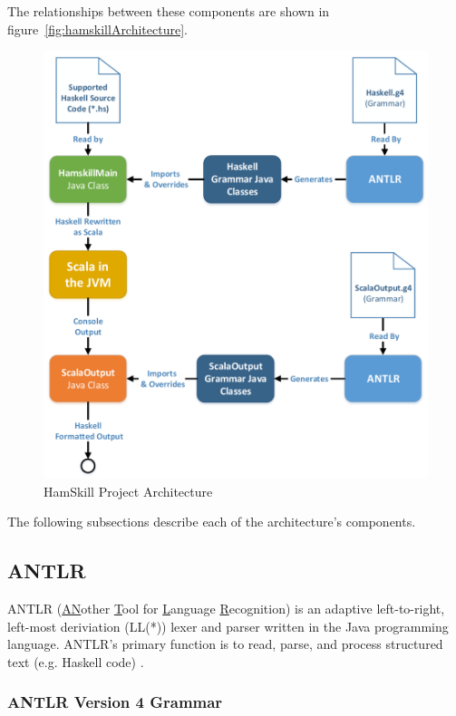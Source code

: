 \documentclass{report}
\begin{document}
The relationships between these components are shown in figure~\ref{fig:hamskillArchitecture}.

\begin{figure}[ht!]
	\centering
		\includegraphics[width=1.0\textwidth]{images/cs252_project_diagram_cropped.pdf}
	\caption{HamSkill Project Architecture}
\end{figure}\label{fig:hamskillArchitecture}

The following subsections describe each of the architecture's components.

\subsection{ANTLR}

ANTLR (\underline{AN}other \underline{T}ool for \underline{L}anguage \underline{R}ecognition) is an adaptive left-to-right, left-most deriviation (LL(*)) lexer and parser written in the Java programming language.  ANTLR's primary function is to read, parse, and process structured text (e.g. Haskell code) \cite{antlrDefinitiveReference}.  

\subsubsection{ANTLR Version 4 Grammar}
\end{document}
